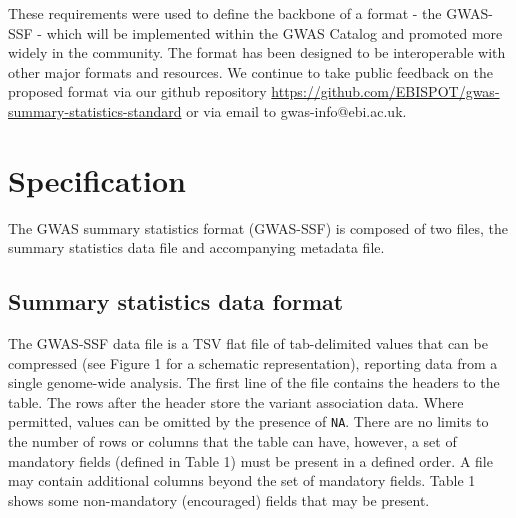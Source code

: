 \documentclass[11pt]{article}
\begin{document}
These requirements were used to define the backbone of a format - the GWAS-SSF - which will be implemented within the GWAS Catalog and promoted more widely in the community. The format has been designed to be interoperable with other major formats and resources. We continue to take public feedback on the proposed format via our github repository \url{https://github.com/EBISPOT/gwas-summary-statistics-standard} or via email to gwas-info@ebi.ac.uk.

\section{Specification}
The GWAS summary statistics format (GWAS-SSF) is composed of two files, the summary statistics data file and accompanying metadata file.

\subsection{Summary statistics data format}
The GWAS-SSF data file is a TSV flat file of tab-delimited values that can be compressed (see Figure 1 for a schematic representation), reporting data from a single genome-wide analysis. The first line of the file contains the headers to the table. The rows after the header store the variant association data. Where permitted, values can be omitted by the presence of \texttt{NA}. There are no limits to the number of rows or columns that the table can have, however, a set of mandatory fields (defined in Table 1) must be present in a defined order. A file may contain additional columns beyond the set of mandatory fields. Table 1 shows some non-mandatory (encouraged) fields that may be present.
\end{document}
